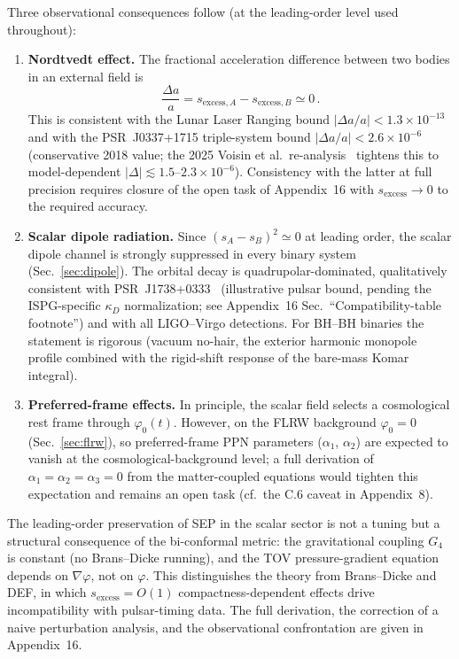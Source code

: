 \documentclass[aps,prd,onecolumn,superscriptaddress,nofootinbib,showpacs,12pt]{revtex4-2}
\begin{document}
Three observational consequences follow (at the
leading-order level used throughout):
\begin{enumerate}
\item \textbf{Nordtvedt effect.}  The fractional
  acceleration difference between two bodies in an
  external field is
  \begin{equation}\label{eq:nordtvedt}
    \frac{\Delta a}{a} = s_{\mathrm{excess},A}
    - s_{\mathrm{excess},B} \simeq 0\,.
  \end{equation}
  This is consistent with the Lunar Laser Ranging
  bound $|\Delta a/a| < 1.3\times10^{-13}$~\cite{Williams2004}
  and with the PSR~J0337+1715 triple-system bound
  $|\Delta a/a| < 2.6\times10^{-6}$~\cite{Archibald2018}
  (conservative 2018 value; the 2025 Voisin et al.\
  re-analysis~\cite{Voisin2025} tightens this to
  model-dependent $|\Delta|\lesssim 1.5$--$2.3\times10^{-6}$).
  Consistency with the latter at full precision requires
  closure of the open task of Appendix~16 with
  $s_{\mathrm{excess}}\to 0$ to the required accuracy.

\item \textbf{Scalar dipole radiation.}  Since
  $(s_{A} - s_{B})^{2} \simeq 0$ at leading order, the
  scalar dipole channel is strongly suppressed in every
  binary system (Sec.~\ref{sec:dipole}).  The orbital
  decay is quadrupolar-dominated, qualitatively
  consistent with PSR~J1738+0333~\cite{Freire2012}
  (illustrative pulsar bound, pending the ISPG-specific
  $\kappa_D$ normalization; see Appendix~16
  Sec.~``Compatibility-table footnote'') and with all
  LIGO--Virgo detections.  For BH--BH binaries the
  statement is rigorous (vacuum no-hair, the exterior
  harmonic monopole profile combined with the
  rigid-shift response of the bare-mass Komar integral).

\item \textbf{Preferred-frame effects.}  In principle,
  the scalar field selects a cosmological rest frame
  through $\varphi_{0}(t)$.  However, on the FLRW
  background $\varphi_{0} = 0$
  (Sec.~\ref{sec:flrw}), so preferred-frame PPN
  parameters ($\alpha_{1}$, $\alpha_{2}$) are expected
  to vanish at the cosmological-background level; a full
  derivation of $\alpha_{1}=\alpha_{2}=\alpha_{3}=0$
  from the matter-coupled equations would tighten this
  expectation and remains an open task (cf.\ the C.6
  caveat in Appendix~8).
\end{enumerate}

The leading-order preservation of SEP in the scalar
sector is not a tuning but a structural consequence of
the bi-conformal metric: the gravitational coupling
$G_{4}$ is constant (no Brans--Dicke running), and the
TOV pressure-gradient equation depends on
$\nabla\varphi$, not on $\varphi$.  This distinguishes
the theory from Brans--Dicke and DEF, in which
$s_{\mathrm{excess}} = O(1)$ compactness-dependent
effects drive incompatibility with pulsar-timing data.  The full derivation, the correction of a
naive perturbation analysis, and the observational
confrontation are given in Appendix~16.
\end{document}
